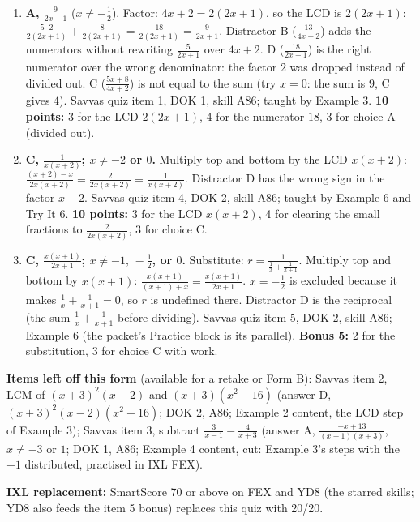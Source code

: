 \documentclass[11pt]{article}
\begin{document}
\begin{enumerate}
\item[\textbf{1.}] \textbf{A, $\frac{9}{2x+1}$} ($x\neq-\frac12$). Factor: $4x+2=2(2x+1)$, so the LCD is $2(2x+1)$: $\frac{5\cdot2}{2(2x+1)}+\frac{8}{2(2x+1)}=\frac{18}{2(2x+1)}=\frac{9}{2x+1}$. Distractor B ($\frac{13}{4x+2}$) adds the numerators without rewriting $\frac{5}{2x+1}$ over $4x+2$. D ($\frac{18}{2x+1}$) is the right numerator over the wrong denominator: the factor $2$ was dropped instead of divided out. C ($\frac{5x+8}{4x+2}$) is not equal to the sum (try $x=0$: the sum is $9$, C gives $4$). Savvas quiz item 1, DOK 1, skill A86; taught by Example 3. \textbf{10 points:} 3 for the LCD $2(2x+1)$, 4 for the numerator $18$, 3 for choice A (divided out).
\item[\textbf{4.}] \textbf{C, $\frac{1}{x(x+2)}$; $x\neq-2$ or $0$.} Multiply top and bottom by the LCD $x(x+2)$: $\frac{(x+2)-x}{2x(x+2)}=\frac{2}{2x(x+2)}=\frac{1}{x(x+2)}$. Distractor D has the wrong sign in the factor $x-2$. Savvas quiz item 4, DOK 2, skill A86; taught by Example 6 and Try It 6. \textbf{10 points:} 3 for the LCD $x(x+2)$, 4 for clearing the small fractions to $\frac{2}{2x(x+2)}$, 3 for choice C.
\item[\textbf{5.}] \textbf{C, $\frac{x(x+1)}{2x+1}$; $x\neq-1,\,-\frac12$, or $0$.} Substitute: $r=\frac{1}{\frac1x+\frac1{x+1}}$. Multiply top and bottom by $x(x+1)$: \mbox{$\frac{x(x+1)}{(x+1)+x}=\frac{x(x+1)}{2x+1}$}. $x=-\frac12$ is excluded because it makes $\frac1x+\frac1{x+1}=0$, so $r$ is undefined there. Distractor D is the reciprocal (the sum $\frac1x+\frac1{x+1}$ before dividing). Savvas quiz item 5, DOK 2, skill A86; Example 6 (the packet's Practice block is its parallel). \textbf{Bonus 5:} 2 for the substitution, 3 for choice C with work.
\end{enumerate}

\textbf{Items left off this form} (available for a retake or Form B): Savvas item 2, LCM of $(x+3)^2(x-2)$ and $(x+3)(x^2-16)$ (answer D, $(x+3)^2(x-2)(x^2-16)$; DOK 2, A86; Example 2 content, the LCD step of Example 3); Savvas item 3, subtract $\frac{3}{x-1}-\frac{4}{x+3}$ (answer A, $\frac{-x+13}{(x-1)(x+3)}$, $x\neq-3$ or $1$; DOK 1, A86; Example 4 content, cut: Example 3's steps with the $-1$ distributed, practised in IXL FEX).

\textbf{IXL replacement:} SmartScore 70 or above on FEX and YD8 (the starred skills; YD8 also feeds the item 5 bonus) replaces this quiz with 20/20.
\end{document}
